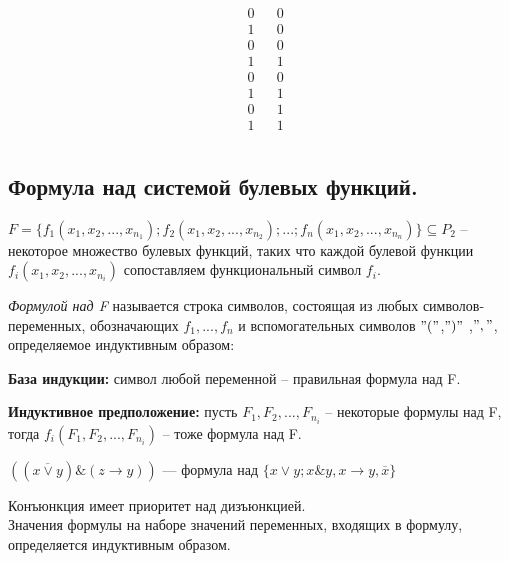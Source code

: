 \begin{enumerate}
$$\begin{array}{rrr|c}
	&
	\begin{array}{r}
	0\\ 1\\ 0\\ 1\\ 0\\ 1\\ 0\\ 1\\
	\end{array}
	&
	\begin{array}{r}
	0\\ 0\\ 0\\ 1\\ 0\\ 1\\ 1\\ 1\\
	\end{array}
	\end{array}
	$$
\end{enumerate}	


\subsection{Формула над системой булевых функций.}
$F=\{f_{1}(x_{1},x_{2},...,x_{n_1});f_{2}(x_{1},x_{2},...,x_{n_2});...;f_{n}(x_{1},x_{2},...,x_{n_n})\}\subseteq P_2$ -- некоторое множество булевых функций, таких что каждой булевой функции $f_{i}(x_{1},x_{2},...,x_{n_i})$ сопоставляем функциональный символ $f_{i}$.
\begin{definition}

	\textit{Формулой над F} называется строка символов, состоящая из любых символов-переменных, обозначающих $f_1,...,f_n$ и вспомогательных символов $"("$,$")"$ ,$","$, определяемое индуктивным образом: 

\textbf{База индукции:} символ любой переменной -- правильная формула над F.

\textbf{Индуктивное предположение: } пусть $F_1,F_2,...,F_{n_i}$ -- некоторые формулы над F, тогда $f_i(F_1,F_2,...,F_{n_i})$ -- тоже формула над F.

\end{definition}
\begin{example}
	$((\overline{x\vee y}) \& (z\longrightarrow y ))$ --- формула над $\{x \vee y; x \& y, x \longrightarrow y, \overline{x} \}$\\
\end{example}
Конъюнкция имеет приоритет над дизъюнкцией.\\
\newpage
Значения формулы на наборе значений переменных, входящих в формулу, определяется индуктивным образом.

